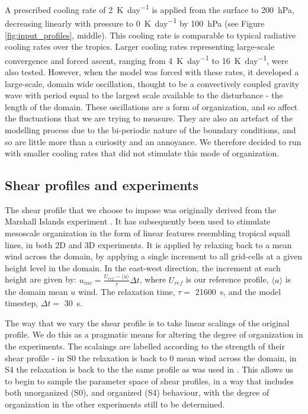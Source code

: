 \documentclass[11pt,a4paper]{article}
\newcommand\todo[1]{\textbf{TODO: #1}}
\begin{document}
A prescribed cooling rate of \SI{2}{K.day^{-1}} is applied from the surface to \SI{200}{hPa}, decreasing linearly with pressure to \SI{0}{K.day^{-1}} by \SI{100}{hPa} (see Figure \ref{fig:input_profiles}, middle). This cooling rate is comparable to typical radiative cooling rates over the tropics. Larger cooling rates representing large-scale convergence and forced ascent, ranging from \SI{4}{K.day^{-1}} to \SI{16}{K.day^{-1}}, were also tested. However, when the model was forced with these rates, it developed a large-scale, domain wide oscillation, thought to be a convectively coupled gravity wave with period equal to the largest scale available to the disturbance - the length of the domain. These oscillations are a form of organization, and so affect the fluctuations that we are trying to measure. They are also an artefact of the modelling process due to the bi-periodic nature of the boundary conditions, and so are little more than a curiosity and an annoyance. We therefore decided to run with smaller cooling rates that did not stimulate this mode of organization.

\subsection{Shear profiles and experiments}

The shear profile that we choose to impose was originally derived from the Marshall Islands experiment \parencite{yanai1973determination}. It has subsequently been used to stimulate mesoscale organization in the form of linear features resembling tropical squall lines, in both 2D \parencite{tompkins2000impact} and 3D \parencite{grabowski1996long, CC2006II} experiments. It is applied by relaxing back to a mean wind across the domain, by applying a single increment to all grid-cells at a given height level in the domain. In the east-west direction, the increment at each height are given by: $u_{inc} = \frac{U_{ref} - \langle u \rangle}{\tau} \Delta t$, where $U_{ref}$ is our reference profile, $\langle u \rangle$ is the domain mean $u$ wind. The relaxation time, $\tau = $ \SI{21600}{s}, and the model timestep, $\Delta t = $ \SI{30}{s}. 

The way that we vary the shear profile is to take linear scalings of the original profile. We do this as a pragmatic means for altering the degree of organization in the experiments. The scalaings are labelled according to the strength of their shear profile - in S0 the relaxation is back to 0 mean wind across the domain, in S4 the relaxation is back to the the same profile as was used in \cite{CC2006II, tompkins2000impact}. This allows us to begin to sample the parameter space of shear profiles, in a way that includes both unorganized (S0), and organized (S4) behaviour, with the degree of organization in the other experiments still to be determined.
\end{document}
